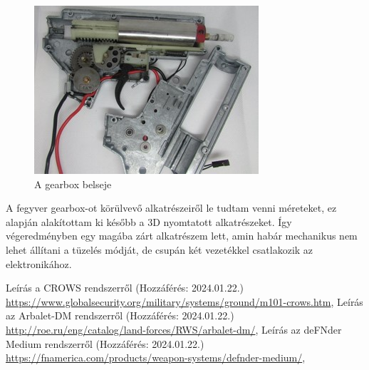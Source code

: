 \documentclass[12pt,a4paper]{article}
\begin{document}
\begin{figure}[h!]
	\centering
	\includegraphics[width=0.6\linewidth]{gearboxbele}
	\caption{A gearbox belseje}
	\label{fig:gearboxbele}
\end{figure}

A fegyver gearbox-ot körülvevő alkatrészeiről le tudtam venni méreteket, ez alapján alakítottam ki később a 3D nyomtatott alkatrészeket. Így végeredményben egy magába zárt alkatrészem lett, amin habár mechanikus nem lehet állítani a tüzelés módját, de csupán két vezetékkel csatlakozik az elektronikához. 



%
%
%
%


























\pagebreak
	\begin{thebibliography}{}
	Leírás a CROWS rendszerről \hfill (Hozzáférés: 2024.01.22.) \\
	{\footnotesize \url{https://www.globalsecurity.org/military/systems/ground/m101-crows.htm}},
	Leírás az Arbalet-DM rendszerről \hfill (Hozzáférés: 2024.01.22.) \\
	{\footnotesize \url{http://roe.ru/eng/catalog/land-forces/RWS/arbalet-dm/}},
	Leírás az deFNder Medium rendszerről \hfill (Hozzáférés: 2024.01.22.) \\
	{\footnotesize \url{https://fnamerica.com/products/weapon-systems/defnder-medium/}},


\end{thebibliography}
\end{document}
